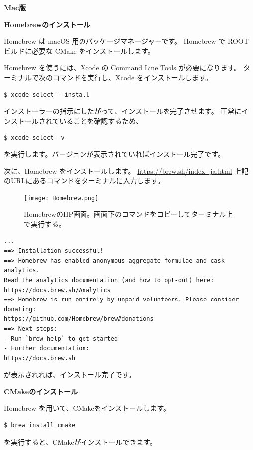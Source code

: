 \vspace{0.5cm}

\vspace{1cm}
{\large \bf Mac版}
\normalsize{}

\vspace{0.5cm}
{\bf Homebrewのインストール}
\vspace{0.3cm}

Homebrew は macOS 用のパッケージマネージャーです。
Homebrew で ROOT ビルドに必要な CMake をインストールします。\par
Homebrew を使うには、Xcode の Command Line Tools が必要になります。
ターミナルで次のコマンドを実行し、Xcode をインストールします。
\begin{lstlisting}
$ xcode-select --install
\end{lstlisting}
インストーラーの指示にしたがって、インストールを完了させます。
正常にインストールされていることを確認するため、
\begin{lstlisting}
$ xcode-select -v
\end{lstlisting}
を実行します。バージョンが表示されていればインストール完了です。\par
次に、Homebrew をインストールします。
\url{https://brew.sh/index_ja.html}
上記のURLにあるコマンドをターミナルに入力します。
\begin{figure}[h]
  \begin{center}
    \texttt{[image: Homebrew.png]}
    \caption{HomebrewのHP画面。画面下のコマンドをコピーしてターミナル上で実行する。}
  \end{center}
\end{figure}
\begin{lstlisting}[caption=Homebrewインストール時のスクリプト]
...
==> Installation successful!
==> Homebrew has enabled anonymous aggregate formulae and cask analytics.
Read the analytics documentation (and how to opt-out) here:
https://docs.brew.sh/Analytics
==> Homebrew is run entirely by unpaid volunteers. Please consider donating:
https://github.com/Homebrew/brew#donations
==> Next steps:
- Run `brew help` to get started
- Further documentation:
https://docs.brew.sh
\end{lstlisting}

が表示されれば、インストール完了です。\par

\vspace{0.5cm}
{\bf CMakeのインストール}
\vspace{0.3cm}

Homebrew を用いて、CMakeをインストールします。
\begin{lstlisting}
$ brew install cmake
\end{lstlisting}
を実行すると、CMakeがインストールできます。


